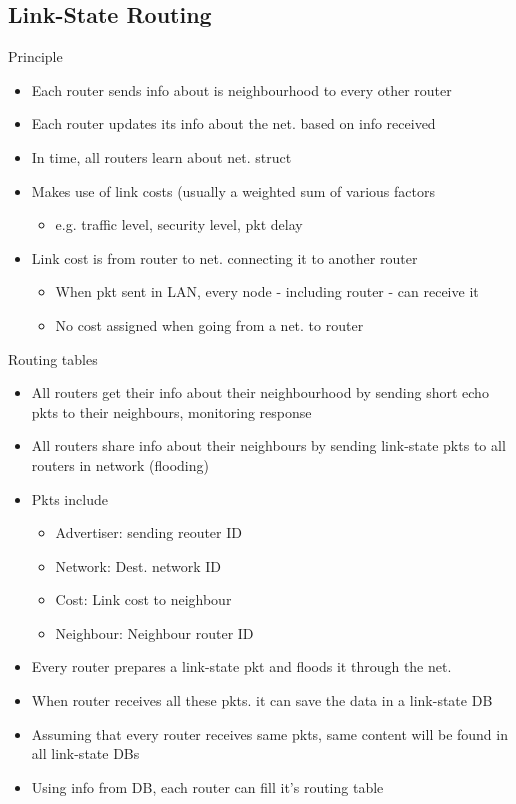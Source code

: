 \documentclass[a4paper]{article}
\begin{document}
\subsection{Link-State Routing}
Principle
\begin{itemize}
	\item Each router sends info about is neighbourhood to every other
		router
	\item Each router updates its info about the net. based on info received
	\item In time, all routers learn about net. struct
	\item Makes use of link costs (usually a weighted sum of various factors
	\begin{itemize}
		\item e.g. traffic level, security level, pkt delay
	\end{itemize}
	\item Link cost is from router to net. connecting it to another router
	\begin{itemize}
		\item When pkt sent in LAN, every node - including router - can
			receive it
		\item No cost assigned when going from a net. to router
	\end{itemize}
\end{itemize}
Routing tables
\begin{itemize}
	\item All routers get their info about their neighbourhood by sending
		short echo pkts to their neighbours, monitoring response
	\item All routers share info about their neighbours by sending
		link-state pkts to all routers in network (flooding)
	\item Pkts include
	\begin{itemize}
		\item Advertiser: sending reouter ID
		\item Network: Dest. network ID
		\item Cost: Link cost to neighbour
		\item Neighbour: Neighbour router ID
	\end{itemize}
	\item Every router prepares a link-state pkt and floods it through the
		net.
	\item When router receives all these pkts. it can save the data in a
		link-state DB
	\item Assuming that every router receives same pkts, same content will
		be found in all link-state DBs
	\item Using info from DB, each router can fill it's routing table
\end{itemize}
\end{document}
